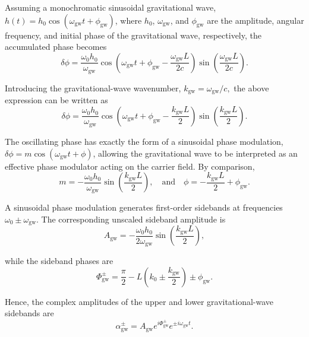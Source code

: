 \documentclass{report}
\begin{document}
Assuming a monochromatic sinusoidal gravitational wave,
$h(t)=h_0\cos\left(\omega_{\mathrm{gw}}t+\phi_{\mathrm{gw}}\right)$, where \(h_0\), \(\omega_{\mathrm{gw}}\), and \(\phi_{\mathrm{gw}}\) are the amplitude, angular frequency, and initial phase of the gravitational wave, respectively, the accumulated phase becomes
\begin{equation}
    \boxed{
\delta\phi
=
\frac{\omega_0h_0}{\omega_{\mathrm{gw}}}
\cos\left(
\omega_{\mathrm{gw}}t
+\phi_{\mathrm{gw}}
-\frac{\omega_{\mathrm{gw}}L}{2c}
\right)
\sin\left(
\frac{\omega_{\mathrm{gw}}L}{2c}
\right).
}
\end{equation}

Introducing the gravitational-wave wavenumber,
$k_{\mathrm{gw}}=\omega_\mathrm{gw}/c,$
the above expression can be written as
\begin{equation}
    \delta\phi
=
\frac{\omega_0h_0}{\omega_{\mathrm{gw}}}
\cos\left(
\omega_{\mathrm{gw}}t
+\phi_{\mathrm{gw}}
-\frac{k_{\mathrm{gw}}L}{2}
\right)
\sin\left(
\frac{k_{\mathrm{gw}}L}{2}
\right).
\end{equation}

The oscillating phase has exactly the form of a sinusoidal phase modulation,
$\delta\phi
=
m\cos(\omega_{\mathrm{gw}}t+\phi)$,
allowing the gravitational wave to be interpreted as an effective phase modulator acting on the carrier field. By comparison,
\begin{equation}
   m
=
-\frac{\omega_0h_0}{\omega_{\mathrm{gw}}}
\sin\left(\frac{k_{\mathrm{gw}}L}{2}\right),
\quad
\text{and}
\quad
\phi
=
-\frac{k_{\mathrm{gw}}L}{2}
+\phi_{\mathrm{gw}}.
\end{equation}

A sinusoidal phase modulation generates first-order sidebands at frequencies
$\omega_0\pm\omega_{\mathrm{gw}}$.
The corresponding unscaled sideband amplitude is
\begin{equation}
A_{\mathrm{gw}}
=
-\frac{\omega_0h_0}
{2\omega_{\mathrm{gw}}}
\sin\left(\frac{k_{\mathrm{gw}}L}{2}\right),
\end{equation}

while the sideband phases are
\begin{equation}
    \Phi_{\mathrm{gw}}^{\pm}
=
\frac{\pi}{2}
-
L\left(
k_0
\pm
\frac{k_{\mathrm{gw}}}{2}
\right)
\pm
\phi_{\mathrm{gw}}.
\end{equation}

Hence, the complex amplitudes of the upper and lower gravitational-wave sidebands are
\begin{equation}
    \alpha_{\mathrm{gw}}^{\pm}
=
A_{\mathrm{gw}}
e^{i\Phi_{\mathrm{gw}}^{\pm}}
e^{\pm i\omega_{\mathrm{gw}}t}.
\end{equation}
\end{document}
